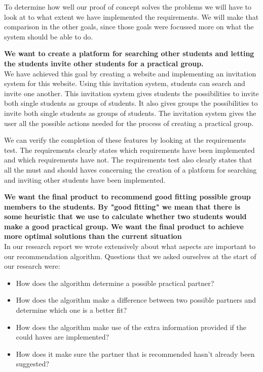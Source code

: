 To determine how well our proof of concept solves the problems we will have to look at to what extent we have implemented the requirements.
We will make that comparison in the other goals, since those goals were focussed  more on what the system should be able to do.

\textbf{We want to create a platform for searching other students and letting the students invite other students for a practical group.}\\
We have achieved this goal by creating a website and implementing an invitation system for this website.
Using this invitation system, students can search and invite one another.
This invitation system gives students the possibilities to invite both single students as groups of students.
It also gives groups the possibilities to invite both single students as groups of students.
The invitation system gives the user all the possible actions needed for the process of creating a practical group.

We can verify the completion of these features by looking at the requirements test.
The requirements clearly states which requirements have been implemented and which requirements have not.
The requirements test also clearly states that all the must and should haves concerning the creation of a platform for searching and inviting other students have been implemented.

\textbf{We want the final product to recommend good fitting possible group members to the students.
By "good fitting" we mean that there is some heuristic that we use to calculate whether two students would make a good practical group.
We want the final product to achieve more optimal solutions than the current situation}\\
In our research report we wrote extensively about what aspects are important to our recommendation algorithm.
Questions that we asked ourselves at the start of our research were:
\begin{itemize}
\item How does the algorithm determine a possible practical partner?
\item How does the algorithm make a difference between two possible partners and determine which one is a better fit?
\item How does the algorithm make use of the extra information provided if the could haves are implemented?
\item How does it make sure the partner that is recommended hasn't already been suggested?
\end{itemize}

